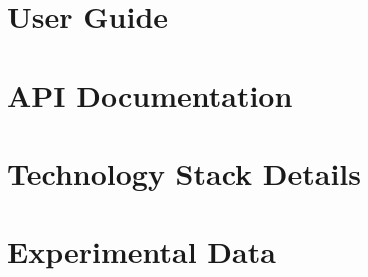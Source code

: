 \documentclass[15pt,a4paper]{book}
\begin{document}


\appendix
\chapter{User Guide}
\label{appendix:user-guide}


\chapter{API Documentation}
\label{appendix:api-documentation}


\chapter{Technology Stack Details}
\label{appendix:technology-stack}


\chapter{Experimental Data}
\label{appendix:experimental-data}




\end{document}

